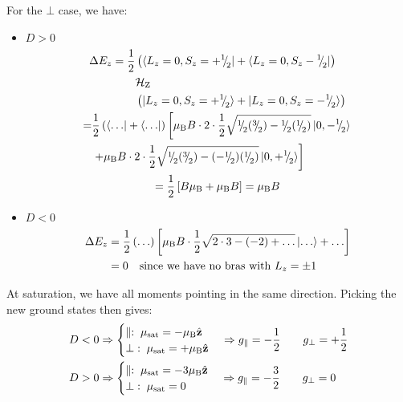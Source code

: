 \begin{parts}
	For the $\bot$ case, we have:
	\begin{itemize}
		\item \underline{$D > 0$}
		\begin{gather*}
			\begin{split}
				\Delta E_z = \frac{1}{2} &\left(\bra{L_z = 0, S_z = +\diagfrac{1}{2}} + \bra{L_z = 0, S_z -\diagfrac{1}{2}}\right) \\
				&\mathcal{H}_\textnormal{Z} \\
				&\left(\ket{L_z = 0, S_z = +\diagfrac{1}{2}} + \ket{L_z = 0, S_z = -\diagfrac{1}{2}}\right)
			\end{split} \\
			\begin{split}
				= &\frac{1}{2} \left(\bra{\ldots} + \bra{\ldots}\right)
				\left[\mu_\textnormal{B} B \cdot 2 \cdot \frac{1}{2} \sqrt{\diagfrac{1}{2} (\diagfrac{3}{2}) - \diagfrac{1}{2} (\diagfrac{1}{2})} \ket{0, -\diagfrac{1}{2}} \right. \\
				&\left. + \mu_\textnormal{B} B \cdot 2 \cdot \frac{1}{2} \sqrt{\diagfrac{1}{2} (\diagfrac{3}{2}) - (-\diagfrac{1}{2}) (\diagfrac{1}{2})} \ket{0, +\diagfrac{1}{2}}\right]
			\end{split} \\
			= \frac{1}{2} \left[B \mu_\textnormal{B} + \mu_\textnormal{B} B\right] = \mu_\textnormal{B} B
		\end{gather*}
		\item \underline{$D < 0$}
		\begin{align*}
			\Delta E_z &= \frac{1}{2} \left(\ldots\right) \left[\mu_\textnormal{B} B \cdot \frac{1}{2} \sqrt{2 \cdot 3 - (-2) + \ldots} \ket{\ldots} + \ldots\right] \\
			&= 0 \textnormal{\hspace{1em}since we have no bras with $L_z = \pm 1$}
		\end{align*}
	\end{itemize}
	
	At saturation, we have all moments pointing in the same direction.
	Picking the new ground states then gives:
	\begin{align*}
		D < 0 &\Rightarrow \begin{cases}
			\parallel:\; \mathbf{\mu}_\textnormal{sat} = -\mu_\textnormal{B} \hat{\mathbf{z}} \\
			\bot:\; \mathbf{\mu}_\textnormal{sat} = +\mu_\textnormal{B} \hat{\mathbf{z}}
		\end{cases} \Rightarrow g_\parallel = -\frac{1}{2} \qquad g_\bot = +\frac{1}{2} \\
		D > 0 &\Rightarrow \begin{cases}
			\parallel:\; \mathbf{\mu}_\textnormal{sat} = -3\mu_\textnormal{B} \hat{\mathbf{z}} \\
			\bot:\; \mathbf{\mu}_\textnormal{sat} = 0
		\end{cases} \Rightarrow g_\parallel = -\frac{3}{2} \qquad g_\bot = 0
	\end{align*}
	

\end{parts}
